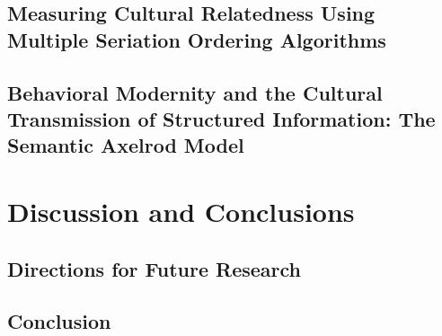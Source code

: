 \documentclass[letterpaper,12pt,final,openright,twoside]{memoir}
\begin{document}
    \chapter{Measuring Cultural Relatedness Using Multiple Seriation Ordering Algorithms}
    \label{chap:multipleseriation-paper}
    
    
    \chapter{Behavioral Modernity and the Cultural Transmission of Structured Information:  The Semantic Axelrod Model}
    \label{chap:semanticaxelrod-paper}
    
    
\part{Discussion and Conclusions}
\label{part:endmatter}

    \chapter{Directions for Future Research}
    \label{chap:future-research}
    
    
    \chapter{Conclusion}
    \label{chap:conclusion}
    

\backmatter %






% 
\end{document}
